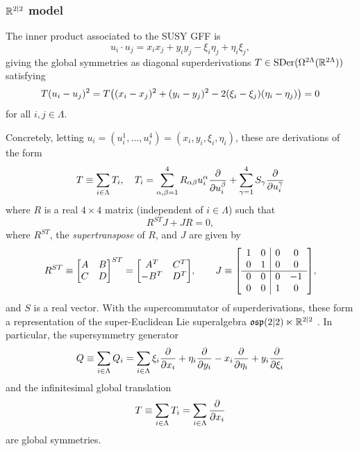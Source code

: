 \documentclass[11pt,a4paper]{article}
\let\originalleft\left
\let\originalright\right
\renewcommand{\left}{\mathopen{}\mathclose\bgroup\originalleft}
\renewcommand{\right}{\aftergroup\egroup\originalright}
\begin{document}
\subsubsection{$\mathbb{R}^{2|2}$ model}
\label{sec:r22iso}
The inner product associated to the SUSY GFF is
\begin{equation}
u_i \cdot u_j = x_ix_j + y_iy_j - \xi_i\eta_j + \eta_i\xi_j,
\end{equation}
giving the global symmetries as diagonal superderivations $T\in
\mathrm{SDer}(\Omega^{2\Lambda}(\mathbb{R}^{2\Lambda}))$ satisfying
\begin{equation}
T(u_i - u_j)^2 = T\left((x_i-x_j)^2 + (y_i-y_j)^2 - 2(\xi_i-\xi_j)(\eta_i-\eta_j) \right) = 0
\end{equation}
for all $i,j\in \Lambda$.

Concretely, letting $u_i = (u^1_i,\dots,u^4_i) = (x_i,y_i,\xi_i,\eta_i)$, these are derivations of the form
\begin{equation}
T \equiv \sum_{i\in \Lambda}T_i,\quad T_i = \sum_{\alpha,\beta = 1}^4 R_{\alpha\beta} u^\alpha_i \frac{\partial }{\partial u^\beta_i} + \sum_{\gamma = 1}^{4}S_{\gamma}\frac{\partial }{\partial u^\gamma_i} 
\end{equation}
where $R$ is a real $4\times 4$ matrix (independent of $i\in\Lambda$) such that
\begin{equation}
R^{ST}J + JR = 0,
\end{equation}
where $R^{ST}$, the \emph{supertranspose} of $R$, and $J$ are given by
\begin{equation}\label{eq:infsymR22}
R^{ST} \bydef \begin{bmatrix}
A&B\\C&D
\end{bmatrix}^{ST} =  \begin{bmatrix}
A^T&C^T\\-B^T&D^T 
\end{bmatrix},
\qquad 
J \bydef \left[\begin{array}{cc|cc}
1 & 0 & 0 & 0 \\
0 & 1 & 0 & 0 \\\hline
0 & 0 & 0 & -1\\
0 & 0 & 1 & 0
\end{array}\right],
\end{equation}
and $S$ is a real vector. With the supercommutator of
superderivations,  these form a
representation of the super-Euclidean Lie superalgebra
$\mathfrak{osp}(2|2)\ltimes \mathbb{R}^{2|2}$ . In particular, the supersymmetry generator
\begin{equation}
Q \equiv \sum_{i\in\Lambda} Q_i = \sum_{i\in \Lambda} \xi_i \frac{\partial }{\partial x_i} + \eta_i \frac{\partial }{\partial y_i} - x_i\frac{\partial }{\partial \eta_i} + y_i \frac{\partial }{\partial \xi_i}
\end{equation}
and the infinitesimal global translation
\begin{equation}
T \equiv \sum_{i\in\Lambda} T_i =  \sum_{i\in \Lambda} \frac{\partial }{\partial x_i}
\end{equation}
are global symmetries. 
\end{document}

